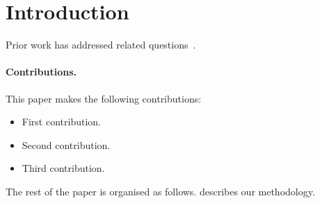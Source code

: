 \section{Introduction}
\label{sec:introduction}

\lipsum[2]

Prior work has addressed related questions~\citep{example2024}. 

\paragraph{Contributions.} This paper makes the following contributions:
\begin{itemize}
  \item First contribution.
  \item Second contribution.
  \item Third contribution.
\end{itemize}

The rest of the paper is organised as follows.  describes our methodology.

